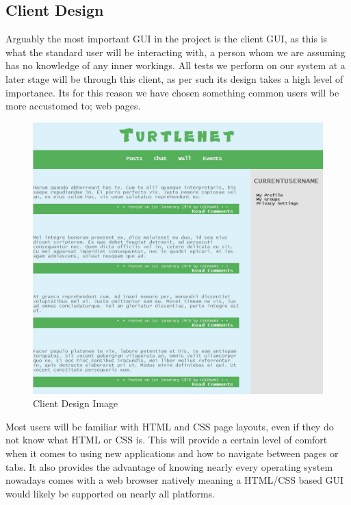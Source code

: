 \subsection{Client Design}
Arguably the most important GUI in the project is the client GUI, as this is what
the standard user will be interacting with, a person whom we are assuming has no
knowledge of any inner workings. All tests we perform on our system at a later 
stage will be through this client, as per such its design takes a high level of
importance. Its for this reason we have chosen something common users will be 
more accustomed to; web pages.

\begin{figure}[h]
    \centering
    \includegraphics[width=\textwidth]{images/design/client_interface.jpg}
    \caption{Client Design Image}
    \label{fig:client}
\end{figure}

Most users will be familiar with HTML and CSS page layouts, even if they do not
know what HTML or CSS is. This will provide a certain level of comfort when it 
comes to using new applications and how to navigate between pages or tabs. It 
also provides the advantage of knowing nearly every operating system nowadays 
comes with a web browser natively meaning a HTML/CSS based GUI would likely be 
supported on nearly all platforms.

